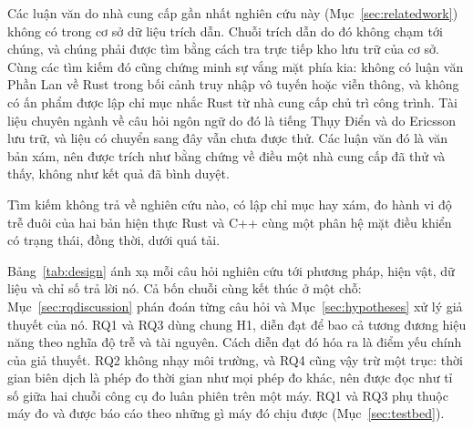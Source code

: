 Các luận văn do nhà cung cấp gần nhất nghiên cứu này (Mục~\ref{sec:relatedwork}) không có trong
cơ sở dữ liệu trích dẫn. Chuỗi trích dẫn do đó không chạm tới chúng, và chúng phải được tìm bằng
cách tra trực tiếp kho lưu trữ của cơ sở. Cùng các tìm kiếm đó cũng chứng minh sự vắng mặt phía
kia: không có luận văn Phần Lan về Rust trong bối cảnh truy nhập vô tuyến hoặc viễn thông, và
không có ấn phẩm được lập chỉ mục nhắc Rust từ nhà cung cấp chủ trì công trình. Tài liệu chuyên
ngành về câu hỏi ngôn ngữ do đó là tiếng Thụy Điển và do Ericsson lưu trữ, và liệu có chuyển
sang đây vẫn chưa được thử. Các luận văn đó là văn bản xám, nên được trích như bằng chứng về
điều một nhà cung cấp đã thử và thấy, không như kết quả đã bình duyệt.

Tìm kiếm không trả về nghiên cứu nào, có lập chỉ mục hay xám, đo hành vi độ trễ đuôi của hai bản
hiện thực Rust và C++ cùng một phân hệ mặt điều khiển có trạng thái, đồng thời, dưới quá tải.

Bảng~\ref{tab:design} ánh xạ mỗi câu hỏi nghiên cứu tới phương pháp, hiện vật, dữ liệu và chỉ số
trả lời nó. Cả bốn chuỗi cùng kết thúc ở một chỗ: Mục~\ref{sec:rqdiscussion} phán đoán từng câu
hỏi và Mục~\ref{sec:hypotheses} xử lý giả thuyết của nó. RQ1 và RQ3 dùng chung H1, diễn đạt để
bao cả tương đương hiệu năng theo nghĩa độ trễ và tài nguyên. Cách diễn đạt đó hóa ra là điểm yếu
chính của giả thuyết. RQ2 không nhạy môi trường, và RQ4 cũng vậy trừ một trục: thời gian biên
dịch là phép đo thời gian như mọi phép đo khác, nên được đọc như tỉ số giữa hai chuỗi công cụ đo
luân phiên trên một máy. RQ1 và RQ3 phụ thuộc máy đo và được báo cáo theo những gì máy đó chịu
được (Mục~\ref{sec:testbed}).

